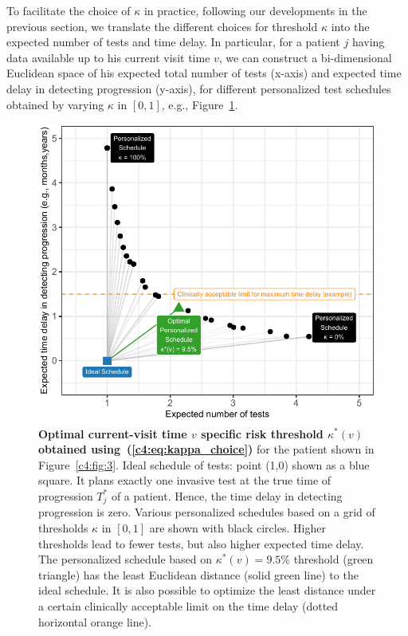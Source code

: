 To facilitate the choice of $\kappa$ in practice, following our developments in the previous section, we translate the different choices for threshold $\kappa$ into the expected number of tests and time delay. In particular, for a patient $j$ having data available up to his current visit time $v$, we can construct a bi-dimensional Euclidean space of his expected total number of tests (x-axis) and expected time delay in detecting progression (y-axis), for different personalized test schedules obtained by varying $\kappa$ in $[0, 1]$, e.g., Figure~\ref{c4:fig:4}.
\begin{figure}
\centerline{\includegraphics{contents/c4/images/c4_fig4.pdf}}
\caption{\textbf{Optimal current-visit time $v$ specific risk threshold $\kappa^*(v)$ obtained using~(\ref{c4:eq:kappa_choice})} for the patient shown in Figure~\ref{c4:fig:3}. Ideal schedule of tests: point (1,0) shown as a blue square. It plans exactly one invasive test at the true time of progression $T^*_j$ of a patient. Hence, the time delay in detecting progression is zero. Various personalized schedules based on a grid of thresholds $\kappa$ in $[0,1]$ are shown with black circles. Higher thresholds lead to fewer tests, but also higher expected time delay. The personalized schedule based on $\kappa^*(v)=9.5\%$ threshold (green triangle) has the least Euclidean distance (solid green line) to the ideal schedule. It is also possible to optimize the least distance under a certain clinically acceptable limit on the time delay (dotted horizontal orange line).}
\label{c4:fig:4}
\end{figure}

